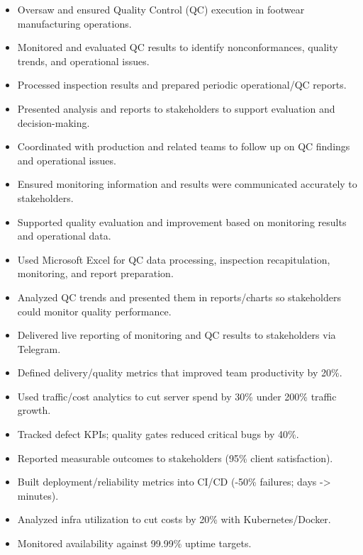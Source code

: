 \begin{itemize}
  \item Oversaw and ensured Quality Control (QC) execution in footwear manufacturing operations.
  \item Monitored and evaluated QC results to identify nonconformances, quality trends, and operational issues.
  \item Processed inspection results and prepared periodic operational/QC reports.
  \item Presented analysis and reports to stakeholders to support evaluation and decision-making.
  \item Coordinated with production and related teams to follow up on QC findings and operational issues.
  \item Ensured monitoring information and results were communicated accurately to stakeholders.
  \item Supported quality evaluation and improvement based on monitoring results and operational data.
  \item Used Microsoft Excel for QC data processing, inspection recapitulation, monitoring, and report preparation.
  \item Analyzed QC trends and presented them in reports/charts so stakeholders could monitor quality performance.
  \item Delivered live reporting of monitoring and QC results to stakeholders via Telegram.
\end{itemize}
\vspace{4pt}
\begin{itemize}
  \item Defined delivery/quality metrics that improved team productivity by 20\%.
  \item Used traffic/cost analytics to cut server spend by 30\% under 200\% traffic growth.
  \item Tracked defect KPIs; quality gates reduced critical bugs by 40\%.
  \item Reported measurable outcomes to stakeholders (95\% client satisfaction).
\end{itemize}
\vspace{4pt}
\begin{itemize}
  \item Built deployment/reliability metrics into CI/CD (-50\% failures; days -> minutes).
  \item Analyzed infra utilization to cut costs by 20\% with Kubernetes/Docker.
  \item Monitored availability against 99.99\% uptime targets.
\end{itemize}
